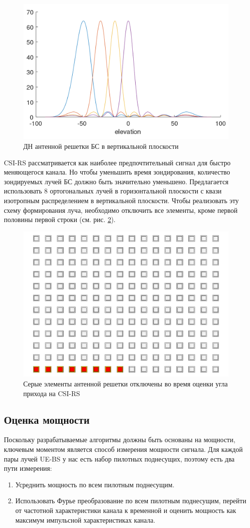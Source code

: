 \begin{figure}[h!]
    \centering
    \includegraphics[width=0.5\linewidth]{figs/fig4.6}
    \caption{ДН антенной решетки БС в вертикальной плоскости}
    \label{fig:4.7}
\end{figure}


CSI-RS рассматривается как наиболее предпочтительный сигнал для быстро меняющегося канала. 
Но чтобы уменьшить время зондирования, количество
зондируемых лучей БС должно быть значительно уменьшено. Предлагается
использовать 8 ортогональных лучей в горизонтальной плоскости с квази изотропным распределением 
в вертикальной плоскости.
Чтобы реализовать эту схему формирования луча, необходимо отключить все
элементы, кроме первой половины первой строки (см. рис. \ref{fig:4.8}).

\begin{figure}[h!]
    \centering
    \includegraphics[width=0.35\linewidth]{figs/fig4.8.pdf}
    \caption{Серые элементы антенной решетки отключены во время оценки угла прихода на CSI-RS}
    \label{fig:4.8}
\end{figure}

\subsection{Оценка мощности}

Поскольку разрабатываемые алгоритмы должны быть основаны на мощности, ключевым
моментом является способ измерения мощности сигнала. Для каждой пары лучей UE-BS
у нас есть набор пилотных поднесущих, поэтому есть два пути измерения:
\begin{enumerate}
    \item Усреднить мощность по всем пилотным поднесущим.
    \item Использовать Фурье преобразование по всем пилотным поднесущим, перейти от частотной характеристики канала к временной и оценить мощность как максимум импульсной характеристиках канала.
\end{enumerate}

